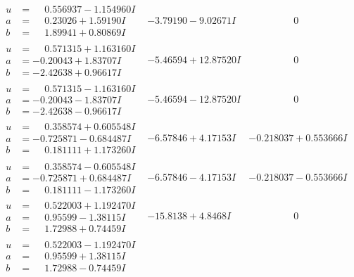 \documentclass[1p]{elsarticle_modified}
\theoremstyle{definition}
\begin{document}
$$\begin{array}{c|c|c}
\begin{aligned}
u &= \phantom{-}0.556937 - 1.154960 I \\
a &= \phantom{-}0.23026 + 1.59190 I \\
b &= \phantom{-}1.89941 + 0.80869 I\end{aligned}
 & -3.79190 - 9.02671 I & \phantom{-0.000000 } 0 \\ \hline\begin{aligned}
u &= \phantom{-}0.571315 + 1.163160 I \\
a &= -0.20043 + 1.83707 I \\
b &= -2.42638 + 0.96617 I\end{aligned}
 & -5.46594 + 12.87520 I & \phantom{-0.000000 } 0 \\ \hline\begin{aligned}
u &= \phantom{-}0.571315 - 1.163160 I \\
a &= -0.20043 - 1.83707 I \\
b &= -2.42638 - 0.96617 I\end{aligned}
 & -5.46594 - 12.87520 I & \phantom{-0.000000 } 0 \\ \hline\begin{aligned}
u &= \phantom{-}0.358574 + 0.605548 I \\
a &= -0.725871 - 0.684487 I \\
b &= \phantom{-}0.181111 + 1.173260 I\end{aligned}
 & -6.57846 + 4.17153 I & -0.218037 + 0.553666 I \\ \hline\begin{aligned}
u &= \phantom{-}0.358574 - 0.605548 I \\
a &= -0.725871 + 0.684487 I \\
b &= \phantom{-}0.181111 - 1.173260 I\end{aligned}
 & -6.57846 - 4.17153 I & -0.218037 - 0.553666 I \\ \hline\begin{aligned}
u &= \phantom{-}0.522003 + 1.192470 I \\
a &= \phantom{-}0.95599 - 1.38115 I \\
b &= \phantom{-}1.72988 + 0.74459 I\end{aligned}
 & -15.8138 + 4.8468 I & \phantom{-0.000000 } 0 \\ \hline\begin{aligned}
u &= \phantom{-}0.522003 - 1.192470 I \\
a &= \phantom{-}0.95599 + 1.38115 I \\
b &= \phantom{-}1.72988 - 0.74459 I\end{aligned}

\end{array}$$
\end{document}
